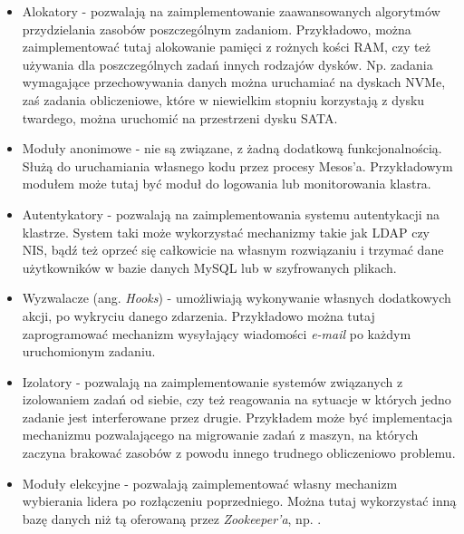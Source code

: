 \documentclass[10pt,a4paper,titlepage,twoside]{report}
\begin{document}
\begin{itemize}
\item Alokatory - pozwalają na zaimplementowanie zaawansowanych algorytmów przydzielania zasobów poszczególnym zadaniom. Przykładowo, można zaimplementować tutaj alokowanie pamięci z rożnych kości RAM, czy też używania dla poszczególnych zadań innych rodzajów dysków. Np. zadania wymagające przechowywania danych można uruchamiać na dyskach NVMe, zaś zadania obliczeniowe, które w niewielkim stopniu korzystają z dysku twardego, można uruchomić na przestrzeni dysku SATA.
\item Moduły anonimowe - nie są związane, z żadną dodatkową funkcjonalnością. Służą do uruchamiania własnego kodu przez procesy Mesos'a. Przykładowym modułem może tutaj być moduł do logowania lub monitorowania klastra.
\item Autentykatory - pozwalają na zaimplementowania systemu autentykacji na klastrze. System taki może wykorzystać mechanizmy takie jak LDAP czy NIS, bądź też oprzeć się całkowicie na własnym rozwiązaniu i trzymać dane użytkowników w bazie danych MySQL lub w szyfrowanych plikach.
\item Wyzwalacze (ang. \textit{Hooks}) - umożliwiają wykonywanie własnych dodatkowych akcji, po wykryciu danego zdarzenia. Przykładowo można tutaj zaprogramować mechanizm wysyłający wiadomości \textit{e-mail} po każdym uruchomionym zadaniu.
\item Izolatory - pozwalają na zaimplementowanie systemów związanych z izolowaniem zadań od siebie, czy też reagowania na sytuacje w których jedno zadanie jest interferowane przez drugie. Przykładem może być implementacja mechanizmu pozwalającego na migrowanie zadań z maszyn, na których zaczyna brakować zasobów z powodu innego trudnego obliczeniowo problemu.
\item Moduły elekcyjne - pozwalają zaimplementować własny mechanizm wybierania lidera po rozłączeniu poprzedniego. Można tutaj wykorzystać inną bazę danych niż tą oferowaną przez \textit{Zookeeper'a}, np. .
\end{itemize}
\end{document}
